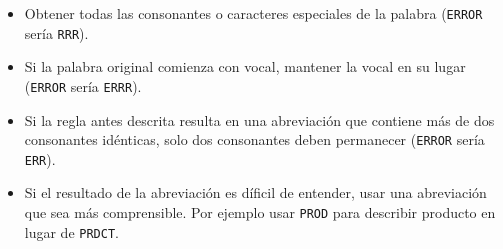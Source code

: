 \begin{itemize}
  \begin{itemize}

  \item Obtener todas las consonantes o caracteres especiales de la palabra
    (\texttt{ERROR} sería \texttt{RRR}).

  \item Si la palabra original comienza con vocal, mantener la vocal en su lugar
    (\texttt{ERROR} sería \texttt{ERRR}).

  \item Si la regla antes descrita resulta en una abreviación que contiene más
    de dos consonantes idénticas, solo dos consonantes deben permanecer
    (\texttt{ERROR} sería \texttt{ERR}).

  \item Si el resultado de la abreviación es díficil de entender, usar una
    abreviación que sea más comprensible. Por ejemplo usar \texttt{PROD} para
    describir producto en lugar de \texttt{PRDCT}.

  \end{itemize}

\end{itemize}

\cleardoublepage

